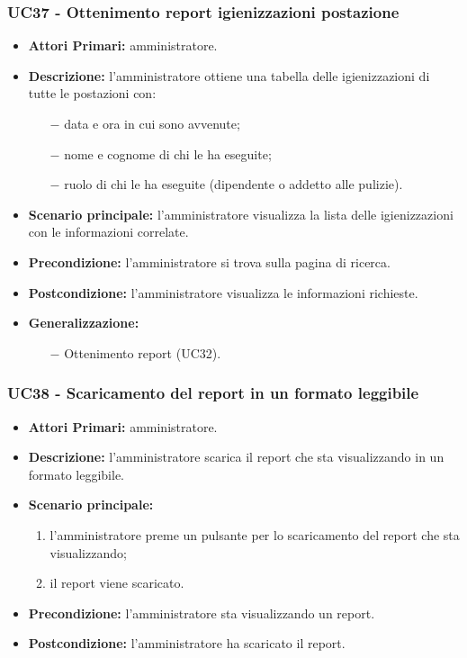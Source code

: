 \subsubsection{ UC37 - Ottenimento report igienizzazioni postazione}
\begin{itemize}
	\item\textbf{Attori Primari:} 
	amministratore.
	\item\textbf{Descrizione:} 
	l'amministratore ottiene una tabella delle igienizzazioni di tutte le postazioni con:
	\begin{itemize}
		\item[$-$] data e ora in cui sono avvenute;
		\item[$-$] nome e cognome di chi le ha eseguite;
		\item[$-$] ruolo di chi le ha eseguite (dipendente o addetto alle pulizie).
	\end{itemize}
	\item\textbf{Scenario principale:} 
	l'amministratore visualizza la lista delle igienizzazioni con le informazioni correlate.
	\item\textbf{Precondizione:} 
	l'amministratore si trova sulla pagina di ricerca.
	\item\textbf{Postcondizione:}
	l'amministratore visualizza le informazioni richieste.
	\item\textbf{Generalizzazione:}
	\begin{itemize}
		\item[$-$] Ottenimento report (UC32).
	\end{itemize}
\end{itemize}


\subsubsection{ UC38 - Scaricamento del report in un formato leggibile}
\begin{itemize}
	\item\textbf{Attori Primari:} 
	amministratore.
	\item\textbf{Descrizione:} 
	l'amministratore scarica il report che sta visualizzando in un formato leggibile.
	\item\textbf{Scenario principale:} 
	\begin{enumerate}
		\item l'amministratore preme un pulsante per lo scaricamento del report che sta visualizzando;
		\item il report viene scaricato.
	\end{enumerate}
	\item\textbf{Precondizione:} 
	l'amministratore sta visualizzando un report.
	\item\textbf{Postcondizione:}
	l'amministratore ha scaricato il report.
\end{itemize}

